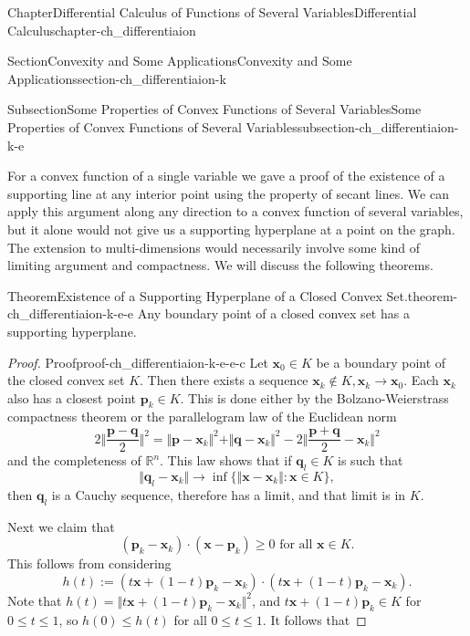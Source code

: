 \documentclass[oneside,10pt,]{book}
\numberwithin{equation}{section}
\begin{document}
\begin{chapterptx}{Chapter}{Differential Calculus of Functions of Several Variables}{}{Differential Calculus}{}{}{chapter-ch_differentiaion}
\begin{sectionptx}{Section}{Convexity and Some Applications}{}{Convexity and Some Applications}{}{}{section-ch_differentiaion-k}
\begin{subsectionptx}{Subsection}{Some Properties of Convex Functions of Several Variables}{}{Some Properties of Convex Functions of Several Variables}{}{}{subsection-ch_differentiaion-k-e}
\par
For a convex function of a single variable we gave a proof of the existence of a supporting line at any interior point using the property of secant lines. We can apply this argument along any direction to a convex function of several variables, but it alone would not give us a supporting hyperplane at a point on the graph.  The extension to multi-dimensions would necessarily involve some kind of limiting argument and compactness. We will discuss the following theorems.%
\begin{theorem}{Theorem}{Existence of a Supporting Hyperplane of a Closed Convex Set.}{}{theorem-ch_differentiaion-k-e-e}%
Any boundary point of a closed convex set has a supporting hyperplane.%
\end{theorem}
\begin{proof}{Proof}{}{proof-ch_differentiaion-k-e-e-c}
Let \(\mathbf x_{0}\in K\) be a boundary point of the closed convex set \(K\). Then there exists a sequence \(\mathbf x_{k} \not\in K, \mathbf x_{k} \to \mathbf x_{0}\). Each \(\mathbf x_{k}\) also has a closest point \(\mathbf p_{k}\in K\). This is done either by the Bolzano-Weierstrass compactness theorem or the parallelogram law of the Euclidean norm%
\begin{equation*}
2\Vert \frac{\mathbf p -\mathbf q}{2}\Vert^{2}=\Vert \mathbf p- \mathbf x_{k}\Vert^{2}
+ \Vert \mathbf q- \mathbf x_{k}\Vert^{2}-2 \Vert \frac{\mathbf p +\mathbf q}{2}- \mathbf x_{k}\Vert^{2}
\end{equation*}
and the completeness of \(\mathbb R^{n}\). This law shows that if \(\mathbf q_{l}\in K\) is such that%
\begin{equation*}
\Vert \mathbf q_{l}- \mathbf x_{k} \Vert \to \inf \{\Vert \mathbf x- \mathbf x_{k} \Vert: \mathbf x \in K\},
\end{equation*}
then \(\mathbf q_{l}\) is a Cauchy sequence, therefore has a limit, and  that limit is in \(K\).%
\par
Next we claim that%
\begin{equation}
(\mathbf p_{k}- \mathbf x_{k})\cdot (\mathbf x - \mathbf p_{k})\ge 0 \text{ for all } \mathbf x \in K.\label{men-zephyr}
\end{equation}
This follows from considering%
\begin{equation*}
h(t) :=(t\mathbf x +(1-t) \mathbf p_{k}-\mathbf x_{k})\cdot (t\mathbf x +(1-t) \mathbf p_{k}-\mathbf x_{k}).
\end{equation*}
Note that \(h(t)=\Vert t\mathbf x +(1-t) \mathbf p_{k}-\mathbf x_{k}\Vert^{2}\), and \(t\mathbf x +(1-t) \mathbf p_{k}\in K\) for \(0\le t \le 1\), so \(h(0)\le h(t)\) for all \(0 \le t\le 1\). It follows that%

\end{proof}
\end{subsectionptx}
\end{sectionptx}
\end{chapterptx}
\end{document}
